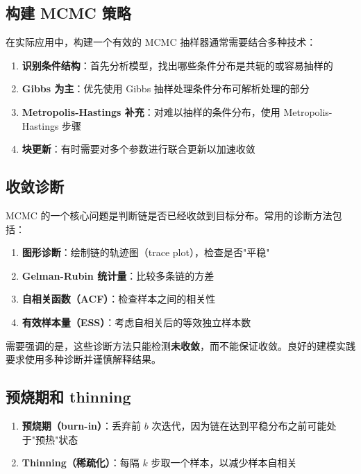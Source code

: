 \subsection{构建 MCMC 策略}

在实际应用中，构建一个有效的 MCMC 抽样器通常需要结合多种技术：

\begin{enumerate}
  \item \textbf{识别条件结构}：首先分析模型，找出哪些条件分布是共轭的或容易抽样的
  \item \textbf{Gibbs 为主}：优先使用 Gibbs 抽样处理条件分布可解析处理的部分
  \item \textbf{Metropolis-Hastings 补充}：对难以抽样的条件分布，使用 Metropolis-Hastings 步骤
  \item \textbf{块更新}：有时需要对多个参数进行联合更新以加速收敛
\end{enumerate}

\subsection{收敛诊断}

MCMC 的一个核心问题是判断链是否已经收敛到目标分布。常用的诊断方法包括：

\begin{enumerate}
  \item \textbf{图形诊断}：绘制链的轨迹图（trace plot），检查是否"平稳"
  \item \textbf{Gelman-Rubin 统计量}：比较多条链的方差
  \item \textbf{自相关函数（ACF）}：检查样本之间的相关性
  \item \textbf{有效样本量（ESS）}：考虑自相关后的等效独立样本数
\end{enumerate}

需要强调的是，这些诊断方法只能检测\textbf{未收敛}，而不能保证收敛。良好的建模实践要求使用多种诊断并谨慎解释结果。

\subsection{预烧期和 thinning}

\begin{enumerate}
  \item \textbf{预烧期（burn-in）}：丢弃前 $b$ 次迭代，因为链在达到平稳分布之前可能处于"预热"状态
  \item \textbf{Thinning（稀疏化）}：每隔 $k$ 步取一个样本，以减少样本自相关
\end{enumerate}

